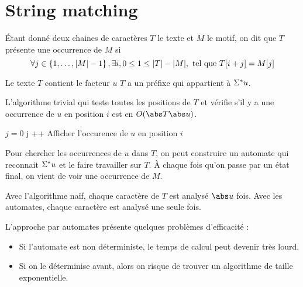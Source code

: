 \section{String matching}

\begin{definition}
	Étant donné deux chaines de caractères $T$ le texte et $M$ le motif, on dit que $T$ présente une occurrence de $M$ si
	$$\forall j \in \left\{1,\ldots,|M| -1\right\}, \exists i, 0 \leq 1 \leq |T| - |M|, \text{ tel que } T[i + j] = M[j]$$
\end{definition}

\begin{remarque}
	Le texte $T$ contient le facteur $u$ \ssi $T$ a un préfixe qui appartient à $\Sigma^{*} u$.
\end{remarque}

\begin{remarque}
	L'algorithme trivial qui teste toutes les positions de $T$ et vérifie s'il y a une occurrence de $u$ en position $i$ est en $O(\abs T \abs u)$.

	\begin{algorithmic}[lines]
		\State $j = 0$
		\State j ++
		\EndIf
		\State Afficher l'occurence de $u$ en position $i$
		\EndIf
		\EndFor
		\EndFunction
	\end{algorithmic}


\end{remarque}

\begin{remarque}
	Pour chercher les occurrences de $u$ dans $T$, on peut construire un automate qui reconnait $\Sigma^{*} u$ et le faire travailler sur $T$.
	À chaque fois qu'on passe par un état final, on vient de voir une occurrence de $M$.
\end{remarque}

\begin{remarque}
	Avec l'algorithme naïf, chaque caractère de $T$ est analysé $\abs u$ fois. Avec les automates, chaque caractère est analysé une seule fois.
\end{remarque}

\begin{remarque}
	L'approche par automates présente quelques problèmes d'efficacité :
	\begin{itemize}
		\item Si l'automate est non déterministe, le temps de calcul peut devenir très lourd.
		\item Si on le déterminise avant, alors on risque de trouver un algorithme de taille exponentielle.
	\end{itemize}
\end{remarque}

